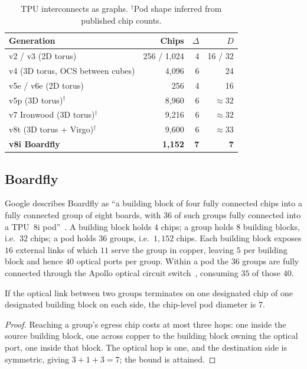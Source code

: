 \documentclass[sigconf,nonacm]{acmart}
\theoremstyle{acmdefinition}%
\begin{document}
\begin{table}[t]
\centering\small
\begin{tabular}{lrrr}
\toprule
Generation & Chips & $\Delta$ & $D$ \\
\midrule
v2 / v3 (2D torus) & 256 / 1{,}024 & 4 & 16 / 32 \\
v4 (3D torus, OCS between cubes) & 4{,}096 & 6 & 24 \\
v5e / v6e (2D torus) & 256 & 4 & 16 \\
v5p (3D torus)$^\dagger$ & 8{,}960 & 6 & ${\approx}32$ \\
v7 Ironwood (3D torus)$^\dagger$ & 9{,}216 & 6 & ${\approx}32$ \\
v8t (3D torus + Virgo)$^\dagger$ & 9{,}600 & 6 & ${\approx}33$ \\
\textbf{v8i Boardfly} & \textbf{1{,}152} & \textbf{7} & \textbf{7} \\
\bottomrule
\end{tabular}
\caption{TPU interconnects as graphs. $^\dagger$Pod shape inferred from
published chip counts.}
\label{tab:generations}
\end{table}

\subsection{Boardfly}

Google describes Boardfly as ``a building block of four fully connected chips
into a fully connected group of eight boards, with 36 of such groups fully
connected into a TPU~8i pod''~\cite{google2026eighthgen}. A building block holds
$4$ chips; a group holds $8$ building blocks, i.e.\ $32$ chips; a pod holds $36$
groups, i.e.\ $1{,}152$ chips. Each building block exposes $16$ external links
of which $11$ serve the group in copper, leaving $5$ per building block and
hence $40$ optical ports per group. Within a pod the $36$ groups are fully
connected through the Apollo optical circuit switch~\cite{poutievski2022jupiter},
consuming $35$ of those $40$.

\begin{lemma}
\label{lem:seven}
If the optical link between two groups terminates on one designated chip of one
designated building block on each side, the chip-level pod diameter is $7$.
\end{lemma}

\begin{proof}
Reaching a group's egress chip costs at most three hops: one inside the source
building block, one across copper to the building block owning the optical port,
one inside that block. The optical hop is one, and the destination side is
symmetric, giving $3+1+3=7$; the bound is attained.
\end{proof}
\end{document}
